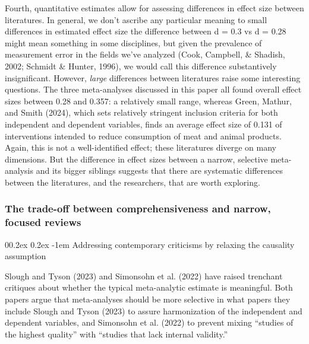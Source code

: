 \documentclass[
  man]{apa6}
\makeatletter
\let\oldparagraph\paragraph
\renewcommand{\paragraph}[1]{\oldparagraph{#1}\mbox{}}
\renewcommand{\paragraph}{\@startsection{paragraph}{4}{\parindent}%
  {0\baselineskip \@plus 0.2ex \@minus 0.2ex}%
  {-1em}%
  {\normalfont\normalsize\bfseries\itshape\typesectitle}}
\makeatother
\begin{document}
Fourth, quantitative estimates allow for assessing differences in effect size between literatures. In general, we don't ascribe any particular meaning to small differences in estimated effect size \textemdash the difference between d = 0.3 vs d = 0.28 might mean something in some disciplines, but given the prevalence of measurement error in the fields we've analyzed (Cook, Campbell, \& Shadish, 2002; Schmidt \& Hunter, 1996), we would call this difference substantively insignificant. However, \emph{large} differences between literatures raise some interesting questions. The three meta-analyses discussed in this paper all found overall effect sizes between 0.28 and 0.357: a relatively small range, whereas Green, Mathur, and Smith (2024), which sets relatively stringent inclusion criteria for both independent and dependent variables, finds an average effect size of 0.131 of interventions intended to reduce consumption of meat and animal products. Again, this is not a well-identified effect; these literatures diverge on many dimensions. But the difference in effect sizes between a narrow, selective meta-analysis and its bigger siblings suggests that there are systematic differences between the literatures, and the researchers, that are worth exploring.

\subsubsection{The trade-off between comprehensiveness and narrow, focused reviews}\label{the-trade-off-between-comprehensiveness-and-narrow-focused-reviews}

\paragraph{Addressing contemporary criticisms by relaxing the causality assumption}\label{addressing-contemporary-criticisms-by-relaxing-the-causality-assumption}

Slough and Tyson (2023) and Simonsohn et al. (2022) have raised trenchant critiques about whether the typical meta-analytic estimate is meaningful. Both papers argue that meta-analyses should be more selective in what papers they include \textemdash Slough and Tyson (2023) to assure harmonization of the independent and dependent variables, and Simonsohn et al. (2022) to prevent mixing ``studies of the highest quality'' with ``studies that lack internal validity.''
\end{document}
